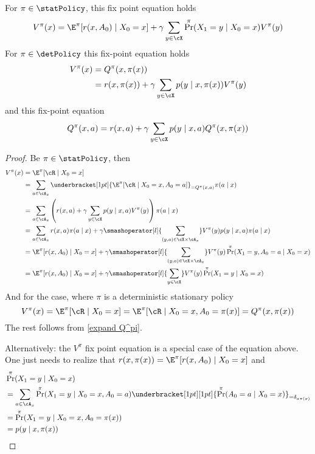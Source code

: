 \begin{corollary}\label{V^pi,Q^pi relation} 
For \(\pi\in\statPolicy\), this fix point equation holds
\[
	V^\pi(x) = \E^\pi[r(x,A_0)\mid X_0=x] 
	+ \gamma \sum_{y\in\cX} \Pr^\pi(X_1=y \mid X_0=x) V^\pi(y)
\]	
For \(\pi\in\detPolicy\) this fix-point equation holds 
\begin{align*}
	V^\pi(x)&=Q^\pi(x,\pi(x))\\
	 &=r(x,\pi(x))+\gamma\sum\limits_{y\in\cX}p(y\mid x,\pi(x))V^\pi(y)
\end{align*}
and this fix-point equation
\[
	Q^\pi(x,a)=r(x,a)+\gamma\sum_{y\in\cX}p(y\mid x,a)Q^\pi(x,\pi(x))
\]
\end{corollary}

\begin{proof} Be \(\pi\in\statPolicy\), then
	\begin{align}
		V^\pi(x)&=\E^\pi[\cR\mid X_0=x] \nonumber\\
		&=\sum_{a\in\cA_x} 
		\underbracket[1pt]{\E^\pi[\cR\mid X_0=x, A_0=a]}_{=Q^\pi(x,a)}\label{stoch pi: V^pi in terms of Q^pi}
		\pi(a\mid x)\\
		&=\sum_{a\in\cA_x} \left(r(x,a)
		+\gamma\sum_{y\in\cX}p(y\mid x,a)V^\pi(y)\right)\pi(a\mid x)\nonumber\\
		&=\sum_{a\in\cA_x}r(x,a)\pi(a\mid x) 
		+ \gamma\smashoperator[l]{\sum_{(y,a)\in\cX\times\cA_x}} 
		V^\pi(y) p(y\mid x,a)\pi(a\mid x)
		\label{stoch pi: fixpoint proof}\\
		&=\E^\pi[r(x,A_0)\mid X_0=x] 
		+ \gamma\smashoperator[l]{\sum_{(y,a)\in\cX\times\cA_x}} V^\pi(y)
		\Pr^\pi(X_1=y, A_0=a \mid X_0=x)\nonumber\\
		&=\E^\pi[r(x,A_0)\mid X_0=x] + \gamma\smashoperator[l]{\sum_{y\in\cX}} V^\pi(y)
		\Pr^\pi(X_1=y\mid X_0=x)\nonumber
	\end{align}
	And for the case, where \(\pi\) is a deterministic stationary policy
	\[
		V^\pi(x)=\E^\pi[\cR\mid X_0=x]=\E^\pi[\cR\mid X_0=x, A_0=\pi(x)]=Q^\pi(x,\pi(x))
	\]
	The rest follows from \ref{expand Q^pi}. 
	
	Alternatively: the \(V^\pi\) fix point equation is a special case of the equation above. One just needs to realize that \(r(x,\pi(x)) = \E^\pi[r(x,A_0)\mid X_0=x]\) and
	\begin{align*}
		&\Pr^\pi(X_1=y\mid X_0=x)\\
		&=\sum_{a\in\cA_x} \Pr^\pi(X_1=y\mid X_0=x, A_0=a) 
		\underbracket[1pt][1pt]{\Pr^\pi(A_0=a\mid X_0=x)}_{=\delta_{a\pi(x)}}\\
		&=\Pr^\pi(X_1=y\mid X_0=x, A_0=\pi(x))\\
		&=p(y\mid x,\pi(x))\qedhere
	\end{align*}
\end{proof}

